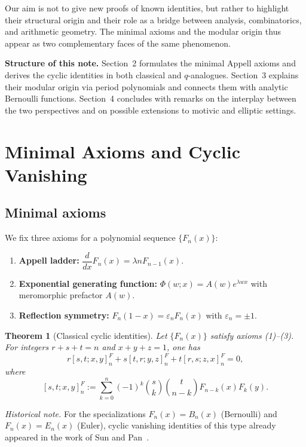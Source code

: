 \documentclass[12pt]{article}
\numberwithin{equation}{section}
\newtheorem{theorem}{Theorem}[section]
\begin{document}
\medskip

Our aim is not to give new proofs of known identities, but rather to highlight
their structural origin and their role as a bridge between analysis,
combinatorics, and arithmetic geometry. The minimal axioms and the modular
origin thus appear as two complementary faces of the same phenomenon.

\medskip

\noindent\textbf{Structure of this note.}  
Section~2 formulates the minimal Appell axioms and derives the cyclic
identities in both classical and $q$-analogues.  
Section~3 explains their modular origin via period polynomials and connects
them with analytic Bernoulli functions.  
Section~4 concludes with remarks on the interplay between the two perspectives
and on possible extensions to motivic and elliptic settings.


\section{Minimal Axioms and Cyclic Vanishing}

\subsection*{Minimal axioms}

We fix three axioms for a polynomial sequence $\{F_n(x)\}$:

\begin{enumerate}
\item \textbf{Appell ladder:} $\dfrac{d}{dx}F_n(x)=\lambda n F_{n-1}(x)$.
\item \textbf{Exponential generating function:}
$\Phi(w;x)=A(w)e^{\lambda wx}$ with meromorphic prefactor $A(w)$.
\item \textbf{Reflection symmetry:}
$F_n(1-x)=\varepsilon_n F_n(x)$ with $\varepsilon_n=\pm1$.
\end{enumerate}

\begin{theorem}[Classical cyclic identities]
Let $\{F_n(x)\}$ satisfy axioms (1)--(3).
For integers $r+s+t=n$ and $x+y+z=1$, one has
\[
r[s,t;x,y]_n^F + s[t,r;y,z]_n^F + t[r,s;z,x]_n^F = 0,
\]
where
\[
[s,t;x,y]_n^F := \sum_{k=0}^n (-1)^k \binom{s}{k}\binom{t}{n-k}
F_{n-k}(x)F_k(y).
\]
\end{theorem}

\noindent\emph{Historical note.}
For the specializations $F_n(x)=B_n(x)$ (Bernoulli) and $F_n(x)=E_n(x)$ (Euler),
cyclic vanishing identities of this type already appeared in the work of Sun and Pan~\cite{SunPan2006}.
\end{document}
